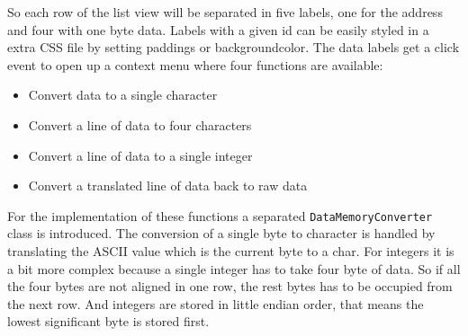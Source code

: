 So each row of the list view will be separated in five labels, one for the address and four with one byte data. Labels with a given id can be easily styled in a extra CSS file by setting paddings or backgroundcolor. The data labels get a click event to open up a context menu where four functions are available:
\begin{itemize}
\item Convert data to a single character
\item Convert a line of data to four characters
\item Convert a line of data to a single integer
\item Convert a translated line of data back to raw data
\end{itemize}
For the implementation of these functions a separated \lstinline$DataMemoryConverter$ class is introduced. The conversion of a single byte to character is handled by translating the ASCII value which is the current byte to a char. For integers it is a bit more complex because a single integer has to take four byte of data. So if all the four bytes are not aligned in one row, the rest bytes has to be occupied from the next row. And integers are stored in little endian order, that means the lowest significant byte is stored first. 